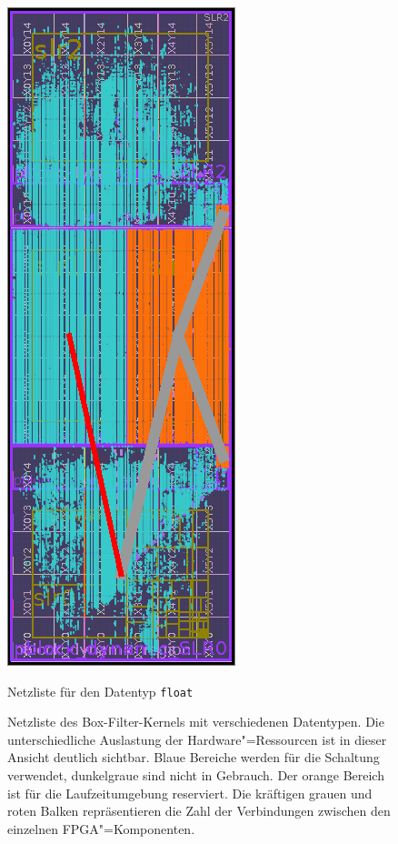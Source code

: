 \begin{figure}[htb]
\begin{minipage}{0.45\textwidth}
        \includegraphics{box_res_float.png}
        \caption*{Netzliste für den Datentyp \texttt{float}}
    \end{minipage}
    \caption[Netzliste des synthetisierten Box-Filter-Kernels mit verschiedenen
             Datentypen]{Netzliste des Box-Filter-Kernels mit verschiedenen
             Datentypen. Die unterschiedliche Auslastung der
             Hardware"=Ressourcen ist in dieser Ansicht deutlich sichtbar. Blaue
             Bereiche werden für die Schaltung verwendet, dunkelgraue sind nicht
             in Gebrauch. Der orange Bereich ist für die Laufzeitumgebung
             reserviert. Die kräftigen grauen und roten Balken repräsentieren
             die Zahl der Verbindungen zwischen den einzelnen
             FPGA"=Komponenten.}
    \label{ergebnisse:box:messung:netzliste}
\end{figure}

